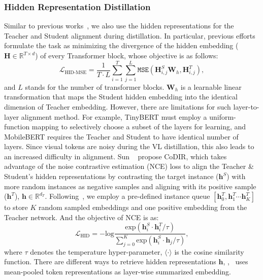 \subsubsection{Hidden Representation Distillation}
Similar to previous works~\cite{jiao2019tinybert,sun2020mobilebert}, we also use the hidden representations for the Teacher and Student alignment during distillation. In particular, previous efforts formulate the task as minimizing the divergence of the hidden embedding ($\mathbf{H}\in\mathbb{R}^{T\times d}$) of every Transformer block, whose objective is as follows:
\begin{equation}
    \mathcal{L}_\text{HID-MSE} = \frac{1}{T\!\cdot\!L}\sum_{i=1}^{T}\sum_{j=1}^{L} \texttt{MSE}(\mathbf{H}^S_{i, j}\mathbf{W}_{h}, \mathbf{H}^T_{i, j}),
\end{equation}
and $L$ stands for the number of transformer blocks. $\mathbf{W}_{h}$ is a learnable linear transformation that maps the Student hidden embedding into the identical dimension of Teacher embedding. However, there are limitations for such layer-to-layer alignment method. For example, TinyBERT must employ a uniform-function mapping to selectively choose a subset of the layers for learning, and MobileBERT requires the Teacher and Student to have identical number of layers. Since visual tokens are noisy during the VL distillation, this also leads to an increased difficulty in alignment. Sun \etal~\cite{sun2020contrastive} propose CoDIR, which takes advantage of the noise contrastive estimation (NCE) loss to align the Teacher \& Student's hidden representations by contrasting the target instance ($\mathbf{h}^S$) with more random instances as negative samples and aligning with its positive sample ($\mathbf{h}^T$), $\mathbf{h}\in\mathbb{R}^{d_T}$. Following~\cite{he2020momentum,fang2021seed,sun2020contrastive}, we employ a pre-defined instance queue $[\mathbf{h}_0^T, \mathbf{h}_1^T \cdots \mathbf{h}_K^T]$ to store $K$ random sampled embeddings and one positive embedding from the Teacher network. And the objective of NCE is as:
\begin{equation}
\mathcal{L}_\text{HID} = -\text{log} \frac{\text{exp}(\mathbf{h}^S_i\cdot\mathbf{h}^T_i/\tau)}{\sum_{j=0}^K\text{exp}(\mathbf{h}^S_i\cdot\mathbf{h}_j/\tau)},
\end{equation}
where $\tau$ denotes the temperature hyper-parameter,  $\langle \cdot \rangle$  is the cosine similarity function. There are different ways to retrieve hidden representations $\mathbf{h}$, \eg,~\cite{sun2020contrastive} uses mean-pooled token representations as layer-wise summarized embedding.
